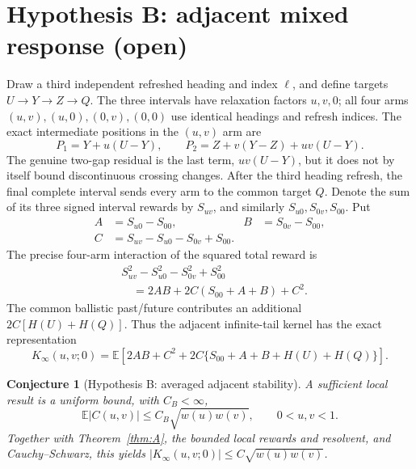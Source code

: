 \documentclass[11pt]{article}
\newtheorem{conjecture}[theorem]{Conjecture}
\theoremstyle{remark}\newtheorem{remark}[theorem]{Remark}
\newcommand{\E}{\mathbb E}\newcommand{\Prb}{\mathbb P}\newcommand{\dd}{\mathrm d}
\begin{document}
\section{Hypothesis B: adjacent mixed response (open)}
Draw a third independent refreshed heading and index $\ell$, and define targets $U\to Y\to Z\to Q$. The three intervals have relaxation factors $u,v,0$; all four arms $(u,v),(u,0),(0,v),(0,0)$ use identical headings and refresh indices. The exact intermediate positions in the $(u,v)$ arm are
\begin{equation}\label{eq:uvresid}
P_1=Y+u(U-Y),\qquad P_2=Z+v(Y-Z)+uv(U-Y).
\end{equation}
The genuine two-gap residual is the last term, $uv(U-Y)$, but it does not by itself bound discontinuous crossing changes. After the third heading refresh, the final complete interval sends every arm to the common target $Q$. Denote the sum of its three signed interval rewards by $S_{uv}$, and similarly $S_{u0},S_{0v},S_{00}$. Put
\begin{align}
A&=S_{u0}-S_{00}, &B&=S_{0v}-S_{00},\\
C&=S_{uv}-S_{u0}-S_{0v}+S_{00}.\label{eq:Bmixed}
\end{align}
The precise four-arm interaction of the squared total reward is
\begin{align}\label{eq:adjidentity}
&S_{uv}^2-S_{u0}^2-S_{0v}^2+S_{00}^2\\
&\hspace{1em}=2AB+2C(S_{00}+A+B)+C^2.\nonumber
\end{align}
The common ballistic past/future contributes an additional $2C[H(U)+H(Q)]$. Thus the adjacent infinite-tail kernel has the exact representation
\begin{equation}\label{eq:adjkernel}
K_\infty(u,v;0)=\E\left[2AB+C^2+2C\{S_{00}+A+B+H(U)+H(Q)\}\right].
\end{equation}

\begin{conjecture}[Hypothesis B: averaged adjacent stability]\label{conj:B}
A sufficient local result is a uniform bound, with $C_B<\infty$,
\begin{equation}\label{eq:Btarget}
\E|C(u,v)|\le C_B\sqrt{w(u)w(v)},\qquad 0<u,v<1.
\end{equation}
Together with Theorem~\ref{thm:A}, the bounded local rewards and resolvent, and Cauchy--Schwarz, this yields $|K_\infty(u,v;0)|\le C\sqrt{w(u)w(v)}$.
\end{conjecture}
\end{document}
